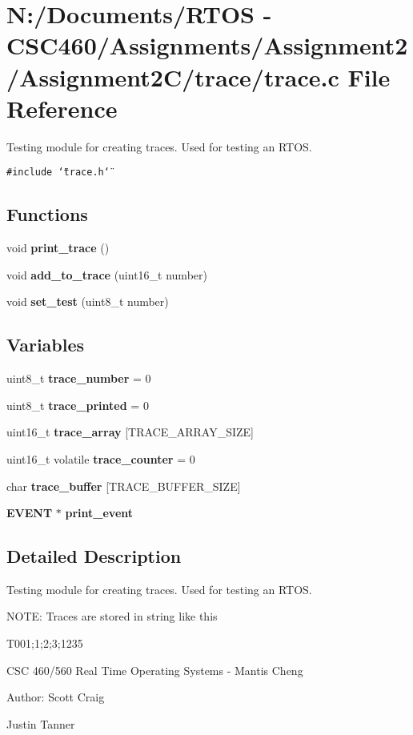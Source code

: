 \section{N:/Documents/RTOS - CSC460/Assignments/Assignment2/Assignment2C/trace/trace.c File Reference}
\label{trace_8c}
Testing module for creating traces. Used for testing an RTOS. 

{\tt \#include \char`\"{}trace.h\char`\"{}}\par
\subsection*{Functions}
\begin{CompactItemize}
\item 
void {\bf print\_\-trace} ()
\item 
void {\bf add\_\-to\_\-trace} (uint16\_\-t number)
\item 
void {\bf set\_\-test} (uint8\_\-t number)
\end{CompactItemize}
\subsection*{Variables}
\begin{CompactItemize}
\item 
uint8\_\-t {\bf trace\_\-number} = 0
\item 
uint8\_\-t {\bf trace\_\-printed} = 0
\item 
uint16\_\-t {\bf trace\_\-array} [TRACE\_\-ARRAY\_\-SIZE]
\item 
uint16\_\-t volatile {\bf trace\_\-counter} = 0
\item 
char {\bf trace\_\-buffer} [TRACE\_\-BUFFER\_\-SIZE]
\item 
{\bf EVENT} $\ast$ {\bf print\_\-event}
\end{CompactItemize}


\subsection{Detailed Description}
Testing module for creating traces. Used for testing an RTOS. 

NOTE: Traces are stored in string like this

T001;1;2;3;1235

CSC 460/560 Real Time Operating Systems - Mantis Cheng \begin{Desc}
\item[Author:]Scott Craig 

Justin Tanner \end{Desc}


